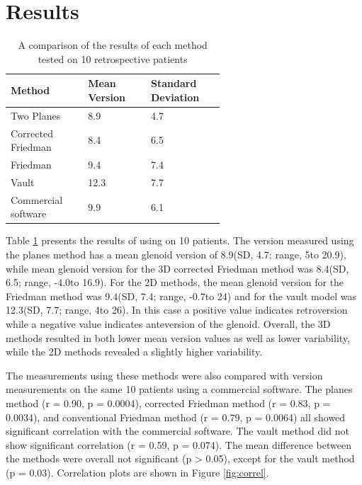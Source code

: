 \section{Results}
\label{sec:results}
\begin{table}
	\begin{center}
		\begin{tabular}{|p{0.2\linewidth}|p{0.2\linewidth}|p{0.2\linewidth}|} \hline
			Method & Mean Version & Standard Deviation \\ \hline
			Two Planes & 8.9\degree & 4.7\degree \\
			Corrected Friedman & 8.4\degree & 6.5\degree \\
			Friedman & 9.4\degree & 7.4\degree \\
			Vault & 12.3\degree & 7.7\degree \\
			Commercial software & 9.9\degree & 6.1\degree \\
                        \hline
		\end{tabular}
	\end{center}
	\caption{\label{tab:results}A comparison of the results of each method tested 
	on 10 retrospective patients}
\end{table}

Table \ref{tab:results} presents the results of using \sksglenoid on 10 patients.
The version measured using the planes method has a mean glenoid
version of 8.9\degree (SD, 4.7\degree; range, 5\degree to 20.9\degree), 
while mean glenoid version 
for the 3D corrected Friedman method 
was 8.4\degree (SD, 6.5\degree; range, -4.0\degree to 16.9\degree). 
For the 2D methods, the mean glenoid version for the 
Friedman method was 9.4\degree (SD, 7.4\degree; range, -0.7\degree to 24\degree) 
and for the vault model was 12.3\degree (SD, 7.7\degree; range, 4\degree to 26\degree).
In this 
case a positive value indicates retroversion while a negative value indicates anteversion of the 
glenoid. Overall, the 3D methods resulted in both lower mean version values as well as lower
variability, while the 2D methods revealed a slightly higher variability.

The measurements using these methods were also compared with version measurements on the same
10 patients using a commercial software\cite{djosurgical}. 
The planes method (r = 0.90, p = 0.0004), 
corrected Friedman method (r = 0.83, p = 0.0034), 
and conventional Friedman method (r = 0.79, p = 0.0064) 
all showed significant correlation with the commercial software. 
The vault method did not show significant correlation (r = 0.59, p = 0.074).  
The mean difference between the methods were overall not significant (p > 0.05), 
except for the vault method (p = 0.03). Correlation plots are shown in Figure \ref{fig:correl}.

